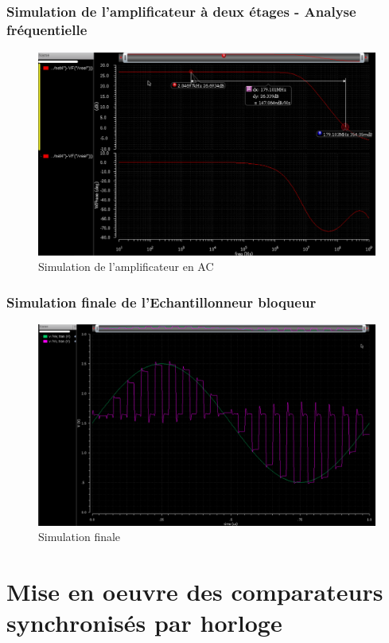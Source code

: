 \documentclass{beamer}
\begin{document}
\begin{frame}
\frametitle{Simulation de l'amplificateur \`a deux \'etages - Analyse fr\'equentielle}

\begin{figure}[!htb]
  \includegraphics[width=0.8\linewidth]{ampli_bode.png}
  \caption{Simulation de l'amplificateur en AC}
\end{figure}

\end{frame}


\begin{frame}
\frametitle{Simulation finale de l'Echantillonneur bloqueur}

\begin{figure}[!htb]
  \includegraphics[width=0.9\linewidth]{echantillonneur_bloqueur_sim_reelle.png}
  \caption{Simulation finale}
\end{figure}

\end{frame}


\section{Mise en oeuvre des comparateurs synchronis\'es par horloge}
\end{document}
